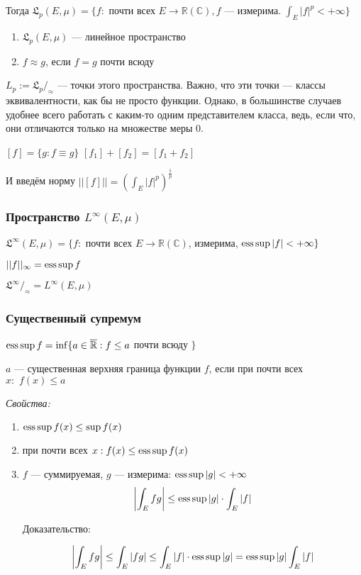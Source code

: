 \documentclass{article}
\def\dbl{\,\,}
\def\rinf{\overline{\mathbb{R}}}
\begin{document}
Тогда $\mathfrak{L}_p(E, \mu) = \{f:$ почти всех $E \rightarrow \mathbb{R} (\mathbb{C}), f$ --- измерима. $\int_{E} |f|^{p} < + \infty\}$

\begin{enumerate}
    \item $\mathfrak{L}_p(E, \mu)$ --- линейное пространство
    \item $f \approx g$, если $f = g$ почти всюду
\end{enumerate}

$L_p := \mathfrak{L}_p /_{\approx}$ --- точки этого пространства. Важно, что эти точки --- классы эквивалентности, как бы не просто функции. Однако, в большинстве случаев удобнее всего работать с каким-то одним представителем класса, ведь, если что, они отличаются только на множестве меры 0.

$[f] = \{g: f \equiv g\}$
$[f_1] + [f_2] = [f_1 + f_2]$

И введём норму $||[f]|| = \left(\int_{E} |f|^{p}\right)^{\frac{1}{p}}$

\subsubsection{Пространство $L^\infty(E,\mu)$}

$\mathfrak{L}^{\infty}(E, \mu) = \{f: $ почти всех $E \rightarrow \mathbb{R} (\mathbb{C})$, измерима, $\operatorname*{ess\,sup} |f| < + \infty\}$

$||f||_{\infty} = \operatorname*{ess\,sup} f$

$\mathfrak{L}^{\infty} /_\approx = L^{\infty}(E, \mu)$

\subsubsection{Существенный супремум}

$\esssup f = \inf \{a \in \rinf: f \le a $ почти всюду $\}$

$a$ --- существенная верхняя граница функции $f$, если при почти всех $x: \dbl f(x) \le a$

\textit{Свойства: }
\begin{enumerate}
    \item $\operatorname*{ess\,sup} f(x) \le \sup f(x)$
    \item при почти всех $x: f(x) \le \operatorname*{ess\,sup} f(x)$
    \item $f$ --- суммируемая, $g$ --- измерима: $\operatorname*{ess\,sup} |g| < + \infty$
    \[\left|\int_{E} fg\right| \le \operatorname*{ess\,sup} |g| \cdot \int_{E} |f|\]

    Доказательство:

    \[\left|\int_{E} fg\right| \le \int_{E} |fg| \le \int_{E} |f| \cdot \operatorname*{ess\,sup} |g| = \operatorname*{ess\,sup} |g| \int_{E} |f|\]
\end{enumerate}
\end{document}
